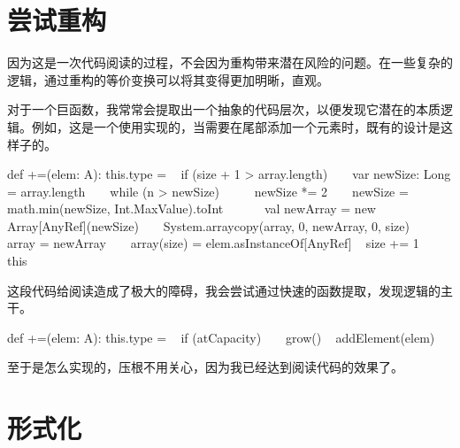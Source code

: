 \section{尝试重构}

\begin{content}

因为这是一次代码阅读的过程，不会因为重构带来潜在风险的问题。在一些复杂的逻辑，通过重构的等价变换可以将其变得更加明晰，直观。

对于一个巨函数，我常常会提取出一个抽象的代码层次，以便发现它潜在的本质逻辑。例如，这是一个使用实现的，当需要在尾部添加一个元素时，既有的设计是这样子的。

\begin{leftbar}
\begin{python}
def +=(elem: A): this.type = {
  if (size + 1 > array.length) {
    var newSize: Long = array.length
    while (n > newSize)
      newSize *= 2
    newSize = math.min(newSize, Int.MaxValue).toInt
  
    val newArray = new Array[AnyRef](newSize)
    System.arraycopy(array, 0, newArray, 0, size)
    array = newArray
  }
  array(size) = elem.asInstanceOf[AnyRef]
  size += 1
  this
}
\end{python}
\end{leftbar}

这段代码给阅读造成了极大的障碍，我会尝试通过快速的函数提取，发现逻辑的主干。

\begin{leftbar}
\begin{python}
def +=(elem: A): this.type = {
  if (atCapacity)
    grow()
  addElement(elem)
}
\end{python}
\end{leftbar}

至于是怎么实现的，压根不用关心，因为我已经达到阅读代码的效果了。

\end{content}

\section{形式化}

